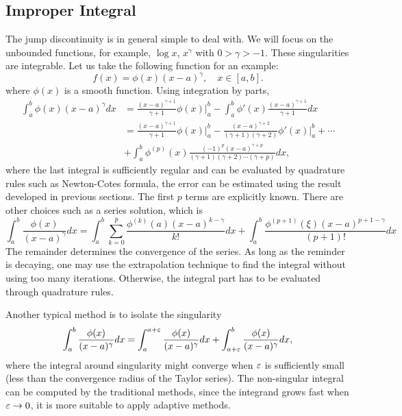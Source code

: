 \subsection{Improper Integral}
\label{SSec: 3-Imp-Int}
The jump discontinuity is in general simple to deal with. We will focus on the unbounded functions, for example, $\log x$, $x^{\gamma}$ with $0 > \gamma > -1$. These singularities are integrable. Let us take the following function for an example: 
$$ f(x ) = \phi(x) (x - a)^{\gamma},\quad x\in[a, b].$$
where $\phi(x)$ is a smooth function. Using integration by parts, 
\begin{equation}
    \begin{aligned}
        \int_a^b  \phi(x) (x - a)^{\gamma} dx &= \frac{(x-a)^{\gamma + 1}}{\gamma + 1} \phi(x)\Big|_a^b - \int_a^b \phi'(x) \frac{(x-a)^{\gamma + 1}}{\gamma + 1} dx \\
        &= \frac{(x-a)^{\gamma + 1}}{\gamma + 1} \phi(x)\Big|_a^b - \frac{(x-a)^{\gamma + 2}}{(\gamma + 1)(\gamma + 2)} \phi'(x)\Big|_a^b + \cdots \\
        & + \int_a^b \phi^{(p)} (x) \frac{(-1)^p (x-a)^{\gamma + p}}{(\gamma + 1)(\gamma + 2)\cdots (\gamma + p)}  dx  ,
    \end{aligned}
\end{equation}
where the last integral is sufficiently regular and can be evaluated by quadrature rules such as Newton-Cotes formula, the error can be estimated using the result developed in previous sections. The first $p$ terms are explicitly known. There are other choices such as a series solution, which is 
\begin{equation}
   \int_a^b  \frac{\phi(x)}{(x - a)^{\gamma}} dx = \int_a^b  \sum_{k=0}^{p} \frac{\phi^{(k)}(a)(x-a)^{k -\gamma }}{k!} dx + \int_a^b \frac{\phi^{(p+1  )}(\xi)(x -a)^{p+1-\gamma }}{(p+1)!} dx 
\end{equation}
The remainder determines the convergence of the series. As long as the reminder is decaying, one may use the extrapolation technique to find the integral without using too many iterations. Otherwise, the integral part has to be evaluated through quadrature rules. 

Another typical method is to isolate the singularity 
\begin{equation}
    \int_a^b \frac{\phi(x)}{(x - a)^{\gamma}} dx =  \int_a^{a + \varepsilon} \frac{\phi(x)}{(x - a)^{\gamma}} dx +  \int_{a+\varepsilon}^b \frac{\phi(x)}{(x - a)^{\gamma}} dx,
\end{equation}
where the integral around singularity might converge when $\varepsilon$ is sufficiently small (less than the convergence radius of the Taylor series). The non-singular integral can be computed by the traditional methods, since the integrand grows fast when $\varepsilon\to 0$, it is more suitable to apply adaptive methods.

